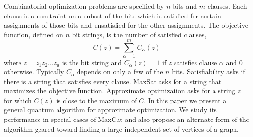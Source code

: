 \documentclass[t11pt,reprint,preprint,preprintnumbers]{revtex4}
\begin{document}
Combinatorial optimization problems are specified by $n$ bits and $m$ clauses.  Each clause is a constraint on a subset of the bits which is satisfied for certain assignments of those bits and unsatisfied for the other assignments.  The objective function, defined on $n$ bit strings, is the number of satisfied clauses, 
\begin{equation}
C(z) = \sum\limits^m_{\alpha=1}\, C_\alpha (z)
\label{FarhiEq1}
\end{equation}
where $z= z_1 z_2\ldots z_n$ is the bit string and $C_{\alpha} (z) = 1$ if $z$ satisfies clause $\alpha$ and 0 otherwise.  Typically $C_\alpha$ depends on only a few of the $n$ bits. Satisfiability asks if there is a string that satisfies every clause.   MaxSat asks for a string that maximizes the objective function.   Approximate optimization asks for a string $z$ for which $C(z)$ is close to the maximum of $C$.  In this paper we present a general quantum algorithm for approximate optimization.   We study its performance in special cases of MaxCut and also propose an alternate form of the algorithm geared toward finding a large independent set of vertices of a graph.
\end{document}
